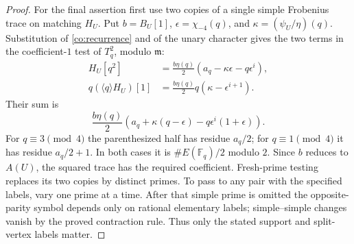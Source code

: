 \begin{proof}
For the final assertion first use two copies of a single simple
Frobenius trace on matching $H_U$.  Put
$b=B_U[1]$, $\epsilon=\chi_{-4}(q)$, and
$\kappa=(\psi_U/\eta)(q)$.  Substitution of
\eqref{co:recurrence} and of the unary character gives the two terms
in the coefficient-$1$ test of $T_q^2$, modulo $\mathfrak m$:
\begin{align*}
 H_U[q^2]&=\frac{b\eta(q)}2
        (a_q-\kappa\epsilon-q\epsilon^i),\\
 q(\langle q\rangle H_U)[1]&=\frac{b\eta(q)}2
        q(\kappa-\epsilon^{i+1}).
\end{align*}
Their sum is
\[
 \frac{b\eta(q)}2
 \left(a_q+\kappa(q-\epsilon)
                    -q\epsilon^i(1+\epsilon)\right).
\]
For $q\equiv3\pmod4$ the parenthesized half has residue $a_q/2$;
for $q\equiv1\pmod4$ it has residue $a_q/2+1$.
In both cases it is $\#E(\mathbb F_q)/2$ modulo $2$.
Since $b$ reduces to $A(U)$, the squared trace has the required
coefficient.  Fresh-prime testing replaces its two copies by
distinct primes.  To pass to any pair with the specified labels,
vary one prime at a time.  After that simple prime is omitted the
opposite-parity symbol depends only on rational elementary labels;
simple--simple changes vanish by the proved contraction rule.
Thus only the stated support and split-vertex labels matter.
\end{proof}
